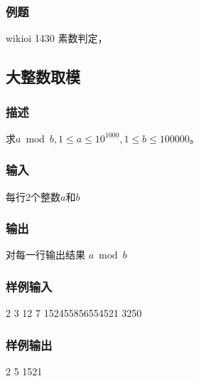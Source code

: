 \subsubsection{例题}
\begindot
\item wikioi 1430 素数判定，
\myenddot


\subsection{大整数取模} %
\subsubsection{描述}
求$a \bmod b, 1 \leq a \leq 10^{1000},1 \leq b \leq 100000$。

\subsubsection{输入}
每行2个整数$a$和$b$

\subsubsection{输出}
对每一行输出结果 $a \bmod b$

\subsubsection{样例输入}
\begin{Code}
2 3
12 7
152455856554521 3250
\end{Code}

\subsubsection{样例输出}
\begin{Code}
2
5
1521
\end{Code}

